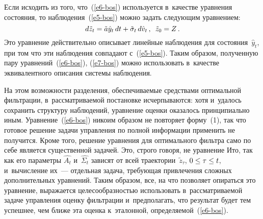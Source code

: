 \begin{multicols}{2}
     Если исходить из того, что~(\ref{e6-bos}) используется в~качестве 
уравнения состояния, то наблюдения~(\ref{e5-bos}) можно задать 
следующим уравнением:
     \begin{equation}
     d\tilde{z}_t=\tilde{a}\hat{y}_t\,dt+\tilde{\sigma}_t\,d\hat{v}_t\,,\enskip 
\tilde{z}_0=Z\,.
     \label{e7-bos}
     \end{equation}
     Это уравнение действительно описывает линейные наблюдения для 
состояния~$\hat{y}_t$, при том что эти наблюдения совпадают 
с~(\ref{e5-bos}). Таким образом, полученную пару уравнений~(\ref{e6-bos}), 
(\ref{e7-bos}) можно использовать в~качестве эквивалентного описания системы 
наблюдения.
     
     На этом возможности разделения, обеспечи\-ва\-емые средствами 
оптимальной фильтрации, в~рассматриваемой постановке исчерпываются: 
хотя и~удалось сохранить структуру наблюдений, уравнение оценки 
оказалось принципиально иным. Уравнение~(\ref{e6-bos}) никоим образом 
не повторяет форму~(1), так что готовое решение задачи управления по 
полной информации применить не получится. Кроме того, решение 
уравнения для оптимального фильт\-ра само по себе является существенной 
задачей. Это, строго говоря, не уравнение Ито, так как его параметры 
$\widehat{A_t}$ и~$\widehat{\Sigma_t}$ зависят от всей 
траектории~$\tilde{z}_\tau$, $0\hm\leq \tau\hm\leq t$, и~вычисление их~--- 
отдельная задача, требующая привлечения сложных дополнительных 
уравнений. Таким образом, все, на что позволяет опираться это уравнение, 
выражается целесообразностью использовать в~рассматриваемой задаче 
управления оценку фильтрации и~предполагать, что результат будет тем 
успешнее, чем ближе эта оценка к~эталонной, определяемой~(\ref{e6-bos}).
     

\end{multicols}
